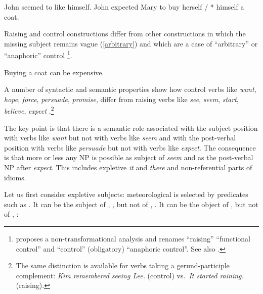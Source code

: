 \eal
\ex John seemed to like himself.\label{ex-john-seemed-to-like-himself}
\ex John expected Mary to buy herself / * himself a coat. \label{exp}
\zl
 
Raising and control constructions differ from other constructions in which the missing subject
remains vague (\ref{arbitrary}) and which are a case of ``arbitrary'' or ``anaphoric'' control
\parencites[--76]{Chomsky1981}[]{Bresnan1982}\footnote{\citet{Bresnan1982} proposes
  a non-transformational analysis and renames ``raising'' ``functional control'' and ``control''
  (obligatory) ``anaphoric control''. See also .}. 
 
\ea
Buying a coat can be expensive.\label{arbitrary}
\z
  
A number of syntactic and semantic properties show how control verbs like \emph{want}, \emph{hope},
\emph{force}, \emph{persuade}, \emph{promise}, differ from raising verbs like \emph{see},
\emph{seem}, \emph{start}, \emph{believe}, \emph{expect} \citep{Rosenbaum67a-u,Postal1974,Bresnan1982}.\footnote{%
  The same distinction is available for verbs taking a gerund-participle complement: 
  \emph{Kim remembered seeing Lee.} (control) vs.\  \emph{It started raining.} (raising).}

The key point is that there is a semantic role associated with the subject position with verbs like
\emph{want} but not with verbs like \emph{seem} and with the post-verbal position with verbs like
\emph{persuade} but not with verbs like \emph{expect}.  The consequence is that more or less any NP
is possible as subject of \emph{seem} and as the post-verbal NP after \emph{expect}. This includes
expletive \emph{it} and \emph{there} and non-referential parts of idioms.

Let us first consider expletive subjects: meteorological  is selected by predicates
such as . It can be the subject of , , but not of ,
. It can be the object of ,  but not of ,
:
	
